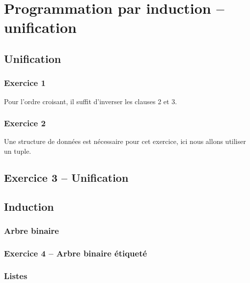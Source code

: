 \documentclass[12pt,a4paper,openany]{book}
\begin{document}
	\thispagestyle{empty} %
	\titleBC 
	\setcounter{tocdepth}{2}
	\setcounter{secnumdepth}{3}
	\tableofcontents
	\chapter{Programmation par induction -- unification}
	\section{Unification}
	\subsection{Exercice 1}
	

	Pour l'ordre croisant, il suffit d'inverser les clauses 2 et 3.
	

	\subsection{Exercice 2}
	Une structure de données est nécessaire pour cet exercice,
	ici nous allons utiliser un tuple.
	
	
	\section{Exercice 3 -- Unification}
	

	\section{Induction}
	\subsection{Arbre binaire}
	
	\subsection{Exercice 4 -- Arbre binaire étiqueté}
	
	\subsection{Listes}
	
	
	
	
	\appendix
	\lstlistoflistings
		
\end{document}
